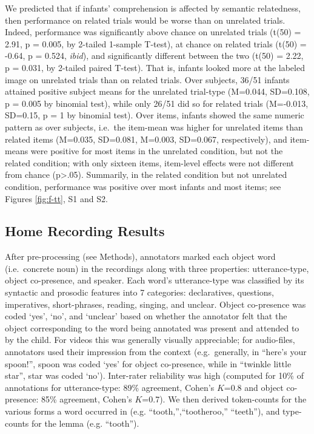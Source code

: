 \documentclass[9pt,twocolumn,twoside,]{pnas-new}
\begin{document}
We predicted that if infants' comprehension is affected by semantic
relatedness, then performance on related trials would be worse than on
unrelated trials. Indeed, performance was significantly above chance on
unrelated trials (t(50) = 2.91, p = 0.005, by 2-tailed 1-sample T-test),
at chance on related trials (t(50) = -0.64, p = 0.524, \emph{ibid}), and
significantly different between the two (t(50) = 2.22, p = 0.031, by
2-tailed paired T-test). That is, infants looked more at the labeled
image on unrelated trials than on related trials. Over subjects, 36/51
infants attained positive subject means for the unrelated trial-type
(M=0.044, SD=0.108, p = 0.005 by binomial test), while only 26/51 did so
for related trials (M=-0.013, SD=0.15, p = 1 by binomial test). Over
items, infants showed the same numeric pattern as over subjects,
i.e.~the item-mean was higher for unrelated items than related items
(M=0.035, SD=0.081, M=0.003, SD=0.067, respectively), and item-means
were positive for most items in the unrelated condition, but not the
related condition; with only sixteen items, item-level effects were not
different from chance (p\textgreater{}.05). Summarily, in the related
condition but not unrelated condition, performance was positive over
most infants and most items; see Figures \ref{fig:f-tt}, S1 and S2.

\subsection*{Home Recording Results}\label{home-rec-res}

After pre-processing (see Methods), annotators marked each object word
(i.e.~concrete noun) in the recordings along with three properties:
utterance-type, object co-presence, and speaker. Each word's
utterance-type was classified by its syntactic and prosodic features
into 7 categories: declaratives, questions, imperatives, short-phrases,
reading, singing, and unclear. Object co-presence was coded `yes', `no',
and `unclear' based on whether the annotator felt that the object
corresponding to the word being annotated was present and attended to by
the child. For videos this was generally visually appreciable; for
audio-files, annotators used their impression from the context
(e.g.~generally, in ``here's your spoon!'', spoon was coded `yes' for
object co-presence, while in ``twinkle little star'', star was coded
`no'). Inter-rater reliability was high (computed for 10\% of
annotations for utterance-type: 89\% agreement, Cohen's \(K\)=0.8 and
object co-presence: 85\% agreement, Cohen's \(K\)=0.7). We then derived
token-counts for the various forms a word occurred in (e.g.
``tooth,'',``tootheroo,'' ``teeth''), and type-counts for the lemma
(e.g. ``tooth'').
\end{document}
